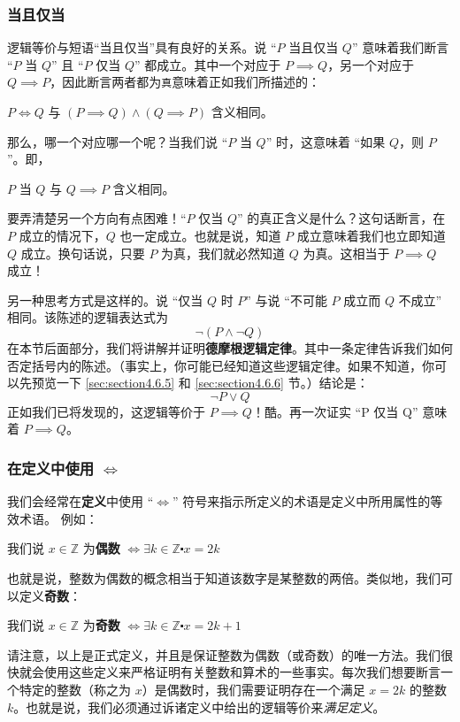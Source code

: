 \subsubsection*{当且仅当}

逻辑等价与短语``当且仅当''具有良好的关系。说 ``$P$ 当且仅当 $Q$'' 意味着我们断言 ``$P$ 当 $Q$'' 且 ``$P$ 仅当 $Q$'' 都成立。其中一个对应于 $P \implies Q$，另一个对应于 $Q \implies P$，因此断言两者都为\verb|真|意味着正如我们所描述的：
\begin{center}
    $P \iff Q$ 与 $(P \implies Q) \land (Q \implies P)$ 含义相同。
\end{center}

那么，哪一个对应哪一个呢？当我们说 ``$P$ 当 $Q$'' 时，这意味着 ``如果 $Q$，则 $P$''。即，
\begin{center}
    $P$ 当 $Q$ 与 $Q \implies P$ 含义相同。
\end{center}

要弄清楚另一个方向有点困难！``$P$ 仅当 $Q$'' 的真正含义是什么？这句话断言，在 $P$ 成立的情况下，$Q$ 也一定成立。也就是说，知道 $P$ 成立意味着我们也立即知道 $Q$ 成立。换句话说，只要 $P$ 为真，我们就必然知道 $Q$ 为真。这相当于 $P \implies Q$ 成立！

另一种思考方式是这样的。说 ``仅当 $Q$ 时 $P$'' 与说 ``不可能 $P$ 成立而 $Q$ 不成立'' 相同。该陈述的逻辑表达式为
\[\neg(P \land \neg Q)\]
在本节后面部分，我们将讲解并证明\textbf{德摩根逻辑定律}。其中一条定律告诉我们如何否定括号内的陈述。（事实上，你可能已经知道这些逻辑定律。如果不知道，你可以先预览一下 \ref{sec:section4.6.5} 和 \ref{sec:section4.6.6} 节。）结论是：
\[\neg P \lor Q\]
正如我们已将发现的，这逻辑等价于 $P \implies Q$！酷。再一次证实 ``P 仅当 Q'' 意味着 $P \implies Q$。

\subsubsection*{在定义中使用 $\iff$}

我们会经常在\textbf{定义}中使用 ``$\iff$'' 符号来指示所定义的术语是定义中所用属性的等效术语。
例如：
\begin{center}
    我们说 $x \in \mathbb{Z}$ 为\textbf{偶数} $\iff \exists k \in \mathbb{Z} \centerdot x = 2k$
\end{center}
也就是说，整数为偶数的概念相当于知道该数字是某整数的两倍。类似地，我们可以定义\textbf{奇数}：
\begin{center}
    我们说 $x \in \mathbb{Z}$ 为\textbf{奇数} $\iff \exists k \in \mathbb{Z} \centerdot x = 2k+1$
\end{center}
请注意，以上是正式定义，并且是保证整数为偶数（或奇数）的唯一方法。我们很快就会使用这些定义来严格证明有关整数和算术的一些事实。每次我们想要断言一个特定的整数（称之为 $x$）是偶数时，我们需要证明存在一个满足 $x = 2k$ 的整数 $k$。也就是说，我们必须通过诉诸定义中给出的逻辑等价来\emph{满足定义}。

